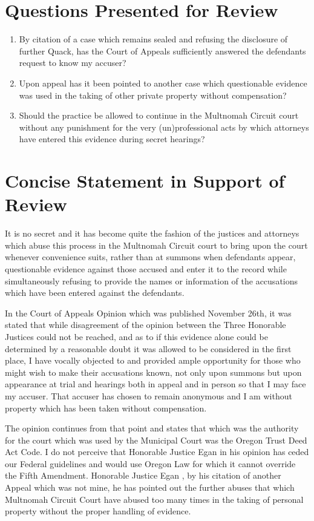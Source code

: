 \documentclass[14pt]{extarticle}
\begin{document}
\section*{Questions Presented for Review}
\begin{enumerate}[label=\arabic*., leftmargin=1.2em, itemsep=0.25\baselineskip]
  \item By citation of a case which remains sealed and refusing the disclosure of further Quack, has the Court of Appeals sufficiently answered the defendants request to know my accuser?
  \item Upon appeal has it been pointed to another case which questionable evidence was used in the taking of other private property without compensation?
  \item Should the practice be allowed to continue in the Multnomah Circuit court without any punishment for the very (un)professional acts by which attorneys have entered this evidence during secret hearings?
\end{enumerate}

\section*{Concise Statement in Support of Review}
It is no secret and it has become quite the fashion of the justices and attorneys which abuse this process in the Multnomah Circuit court to bring upon the court whenever convenience suits, rather than at summons when defendants appear, questionable evidence against those accused and enter it to the record while simultaneously refusing to provide the names or information of the accusations which have been entered against the defendants.

In the Court of Appeals Opinion which was published November 26th, it was stated that while disagreement of the opinion between the Three Honorable Justices could not be reached, and as to if this evidence alone could be determined by a reasonable doubt it was allowed to be considered in the first place, I have vocally objected to and provided ample opportunity for those who might wish to make their accusations known, not only upon summons but upon appearance at trial and hearings both in appeal and in person so that I may face my accuser. That accuser has chosen to remain anonymous and I am without property which has been taken without compensation.

The opinion continues from that point and states that which was the authority for the court which was used by the Municipal Court was the Oregon Trust Deed Act Code. I do not perceive that Honorable Justice Egan in his opinion has ceded our Federal guidelines and would use Oregon Law for which it cannot override the Fifth Amendment. Honorable Justice Egan , by his citation of another Appeal which was not mine, he has pointed out the further abuses that which Multnomah Circuit Court have abused too many times in the taking of personal property without the proper handling of evidence.
\end{document}
